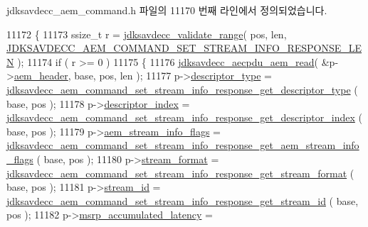jdksavdecc\+\_\+aem\+\_\+command.\+h 파일의 11170 번째 라인에서 정의되었습니다.


\begin{DoxyCode}
11172 \{
11173     ssize\_t r = \hyperlink{group__util_ga9c02bdfe76c69163647c3196db7a73a1}{jdksavdecc\_validate\_range}( pos, len, 
      \hyperlink{group__command__set__stream__info__response_gaebff86b0d3ebae556fa3978476aafbf3}{JDKSAVDECC\_AEM\_COMMAND\_SET\_STREAM\_INFO\_RESPONSE\_LEN} );
11174     \textcolor{keywordflow}{if} ( r >= 0 )
11175     \{
11176         \hyperlink{group__aecpdu__aem_gae2421015dcdce745b4f03832e12b4fb6}{jdksavdecc\_aecpdu\_aem\_read}( &p->\hyperlink{structjdksavdecc__aem__command__set__stream__info__response_ae1e77ccb75ff5021ad923221eab38294}{aem\_header}, base, pos, len );
11177         p->\hyperlink{structjdksavdecc__aem__command__set__stream__info__response_ab7c32b6c7131c13d4ea3b7ee2f09b78d}{descriptor\_type} = 
      \hyperlink{group__command__set__stream__info__response_ga2af288f63567f10108700f344f7ed7c2}{jdksavdecc\_aem\_command\_set\_stream\_info\_response\_get\_descriptor\_type}
      ( base, pos );
11178         p->\hyperlink{structjdksavdecc__aem__command__set__stream__info__response_a042bbc76d835b82d27c1932431ee38d4}{descriptor\_index} = 
      \hyperlink{group__command__set__stream__info__response_ga5beccd46178ec84a68905e0520124ef5}{jdksavdecc\_aem\_command\_set\_stream\_info\_response\_get\_descriptor\_index}
      ( base, pos );
11179         p->\hyperlink{structjdksavdecc__aem__command__set__stream__info__response_a01e6193642f6392292ade676656c9118}{aem\_stream\_info\_flags} = 
      \hyperlink{group__command__set__stream__info__response_gaf15d543a9197e58bc71d1676fd0d880c}{jdksavdecc\_aem\_command\_set\_stream\_info\_response\_get\_aem\_stream\_info\_flags}
      ( base, pos );
11180         p->\hyperlink{structjdksavdecc__aem__command__set__stream__info__response_a77359be54ea386b1da66597746709ed0}{stream\_format} = 
      \hyperlink{group__command__set__stream__info__response_ga68def33404fd92dcfe5c8d0b48a35b2f}{jdksavdecc\_aem\_command\_set\_stream\_info\_response\_get\_stream\_format}
      ( base, pos );
11181         p->\hyperlink{structjdksavdecc__aem__command__set__stream__info__response_af4c017686a11885d1d514c21bcde8160}{stream\_id} = 
      \hyperlink{group__command__set__stream__info__response_ga6a884a660e0368fee44b9f88ec11609f}{jdksavdecc\_aem\_command\_set\_stream\_info\_response\_get\_stream\_id}
      ( base, pos );
11182         p->\hyperlink{structjdksavdecc__aem__command__set__stream__info__response_a58ec17b43515ffd62f6380695f8f59b2}{msrp\_accumulated\_latency} = 

\end{DoxyCode}
